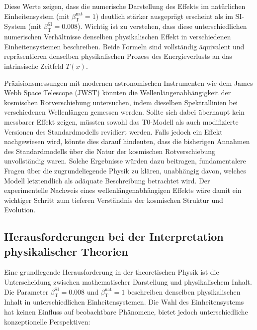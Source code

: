 \documentclass[12pt,a4paper]{article}
\newcommand{\Tfield}{T(x)}
\newcommand{\betaT}{\beta_{\text{T}}}
\begin{document}
	Diese Werte zeigen, dass die numerische Darstellung des Effekts im natürlichen Einheitensystem (mit \(\betaT^{\text{nat}} = 1\)) deutlich stärker ausgeprägt erscheint als im SI-System (mit \(\betaT^{\text{SI}} = 0.008\)). Wichtig ist zu verstehen, dass diese unterschiedlichen numerischen Verhältnisse denselben physikalischen Effekt in verschiedenen Einheitensystemen beschreiben. Beide Formeln sind vollständig äquivalent und repräsentieren denselben physikalischen Prozess des Energieverlusts an das intrinsische Zeitfeld \(\Tfield\).
	
	Präzisionsmessungen mit modernen astronomischen Instrumenten wie dem James Webb Space Telescope (JWST) könnten die Wellenlängenabhängigkeit der kosmischen Rotverschiebung untersuchen, indem dieselben Spektrallinien bei verschiedenen Wellenlängen gemessen werden. Sollte sich dabei überhaupt kein messbarer Effekt zeigen, müssten sowohl das T0-Modell als auch modifizierte Versionen des Standardmodells revidiert werden. Falls jedoch ein Effekt nachgewiesen wird, könnte dies darauf hindeuten, dass die bisherigen Annahmen des Standardmodells über die Natur der kosmischen Rotverschiebung unvollständig waren. Solche Ergebnisse würden dazu beitragen, fundamentalere Fragen über die zugrundeliegende Physik zu klären, unabhängig davon, welches Modell letztendlich als adäquate Beschreibung betrachtet wird. Der experimentelle Nachweis eines wellenlängenabhängigen Effekts wäre damit ein wichtiger Schritt zum tieferen Verständnis der kosmischen Struktur und Evolution.
	
	\subsection{Herausforderungen bei der Interpretation physikalischer Theorien}
	
	Eine grundlegende Herausforderung in der theoretischen Physik ist die Unterscheidung zwischen mathematischer Darstellung und physikalischem Inhalt. Die Parameter \(\betaT^{\text{SI}} = 0.008\) und \(\betaT^{\text{nat}} = 1\) beschreiben denselben physikalischen Inhalt in unterschiedlichen Einheitensystemen. Die Wahl des Einheitensystems hat keinen Einfluss auf beobachtbare Phänomene, bietet jedoch unterschiedliche konzeptionelle Perspektiven:
	
\end{document}
